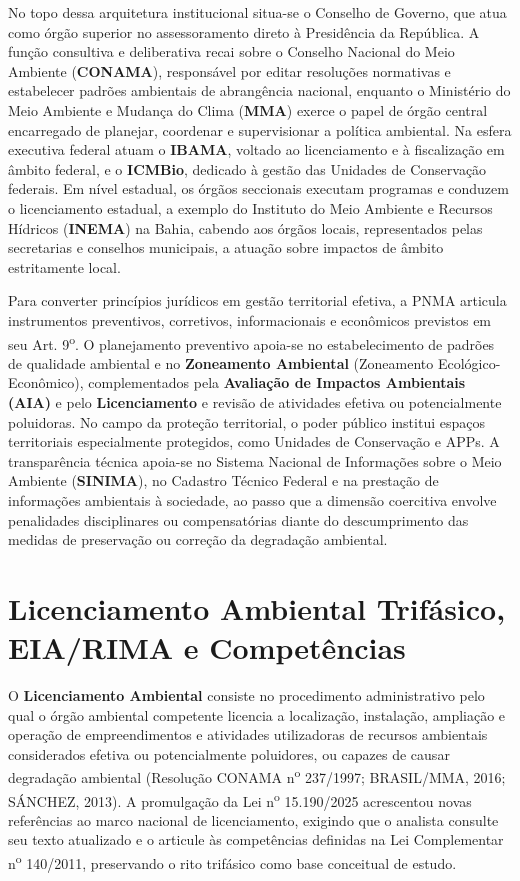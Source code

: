 No topo dessa arquitetura institucional situa-se o Conselho de Governo, que atua como órgão superior no assessoramento direto à Presidência da República. A função consultiva e deliberativa recai sobre o Conselho Nacional do Meio Ambiente (\textbf{CONAMA}), responsável por editar resoluções normativas e estabelecer padrões ambientais de abrangência nacional, enquanto o Ministério do Meio Ambiente e Mudança do Clima (\textbf{MMA}) exerce o papel de órgão central encarregado de planejar, coordenar e supervisionar a política ambiental. Na esfera executiva federal atuam o \textbf{IBAMA}, voltado ao licenciamento e à fiscalização em âmbito federal, e o \textbf{ICMBio}, dedicado à gestão das Unidades de Conservação federais. Em nível estadual, os órgãos seccionais executam programas e conduzem o licenciamento estadual, a exemplo do Instituto do Meio Ambiente e Recursos Hídricos (\textbf{INEMA}) na Bahia, cabendo aos órgãos locais, representados pelas secretarias e conselhos municipais, a atuação sobre impactos de âmbito estritamente local.

Para converter princípios jurídicos em gestão territorial efetiva, a PNMA articula instrumentos preventivos, corretivos, informacionais e econômicos previstos em seu Art. 9\textsuperscript{o}. O planejamento preventivo apoia-se no estabelecimento de padrões de qualidade ambiental e no \textbf{Zoneamento Ambiental} (Zoneamento Ecológico-Econômico), complementados pela \textbf{Avaliação de Impactos Ambientais (AIA)} e pelo \textbf{Licenciamento} e revisão de atividades efetiva ou potencialmente poluidoras. No campo da proteção territorial, o poder público institui espaços territoriais especialmente protegidos, como Unidades de Conservação e APPs. A transparência técnica apoia-se no Sistema Nacional de Informações sobre o Meio Ambiente (\textbf{SINIMA}), no Cadastro Técnico Federal e na prestação de informações ambientais à sociedade, ao passo que a dimensão coercitiva envolve penalidades disciplinares ou compensatórias diante do descumprimento das medidas de preservação ou correção da degradação ambiental.

\section{Licenciamento Ambiental Trifásico, EIA/RIMA e Competências}

O \textbf{Licenciamento Ambiental} consiste no procedimento administrativo pelo qual o órgão ambiental competente licencia a localização, instalação, ampliação e operação de empreendimentos e atividades utilizadoras de recursos ambientais considerados efetiva ou potencialmente poluidores, ou capazes de causar degradação ambiental (Resolução CONAMA n\textsuperscript{o} 237/1997; BRASIL/MMA, 2016; SÁNCHEZ, 2013). A promulgação da Lei n\textsuperscript{o} 15.190/2025 acrescentou novas referências ao marco nacional de licenciamento, exigindo que o analista consulte seu texto atualizado e o articule às competências definidas na Lei Complementar n\textsuperscript{o} 140/2011, preservando o rito trifásico como base conceitual de estudo.

